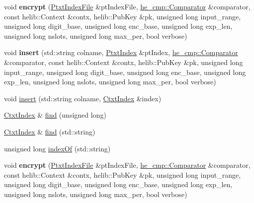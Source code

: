 \begin{DoxyCompactItemize}
\item 
\mbox{\label{classHDB__supergate___1_1CtxtIndexFile_a36979271995370a2e2376877cff9cf29}} 
void {\bfseries encrypt} (\hyperlink{classHDB__supergate___1_1PtxtIndexFile}{Ptxt\+Index\+File} \&pt\+Index\+File, \hyperlink{classhe__cmp_1_1Comparator}{he\+\_\+cmp\+::\+Comparator} \&comparator, const helib\+::\+Context \&contx, helib\+::\+Pub\+Key \&pk, unsigned long input\+\_\+range, unsigned long digit\+\_\+base, unsigned long enc\+\_\+base, unsigned long exp\+\_\+len, unsigned long nslots, unsigned long max\+\_\+per, bool verbose)
\item 
\mbox{\label{classHDB__supergate___1_1CtxtIndexFile_af5316d579090faa7872b4f00b5b55bdf}} 
void {\bfseries insert} (std\+::string colname, \hyperlink{classHDB__supergate___1_1PtxtIndex}{Ptxt\+Index} \&pt\+Index, \hyperlink{classhe__cmp_1_1Comparator}{he\+\_\+cmp\+::\+Comparator} \&comparator, const helib\+::\+Context \&contx, helib\+::\+Pub\+Key \&pk, unsigned long input\+\_\+range, unsigned long digit\+\_\+base, unsigned long enc\+\_\+base, unsigned long exp\+\_\+len, unsigned long nslots, unsigned long max\+\_\+per, bool verbose)
\item 
void \hyperlink{classHDB__supergate___1_1CtxtIndexFile_ab581d8e3c893b29a80b18413b1c45412}{insert} (std\+::string colname, \hyperlink{classHDB__supergate___1_1CtxtIndex}{Ctxt\+Index} \&index)
\item 
\hyperlink{classHDB__supergate___1_1CtxtIndex}{Ctxt\+Index} \& \hyperlink{classHDB__supergate___1_1CtxtIndexFile_a52792f06177d60f6580a664f24b706ee}{find} (unsigned long)
\item 
\hyperlink{classHDB__supergate___1_1CtxtIndex}{Ctxt\+Index} \& \hyperlink{classHDB__supergate___1_1CtxtIndexFile_aa579ec2799b316a65f426356ca76efd8}{find} (std\+::string)
\item 
unsigned long \hyperlink{classHDB__supergate___1_1CtxtIndexFile_abbc89b8e64ca3bcfe104c2371336bd9f}{index\+Of} (std\+::string)
\item 
\mbox{\label{classHDB__supergate___1_1CtxtIndexFile_a36979271995370a2e2376877cff9cf29}} 
void {\bfseries encrypt} (\hyperlink{classHDB__supergate___1_1PtxtIndexFile}{Ptxt\+Index\+File} \&pt\+Index\+File, \hyperlink{classhe__cmp_1_1Comparator}{he\+\_\+cmp\+::\+Comparator} \&comparator, const helib\+::\+Context \&contx, helib\+::\+Pub\+Key \&pk, unsigned long input\+\_\+range, unsigned long digit\+\_\+base, unsigned long enc\+\_\+base, unsigned long exp\+\_\+len, unsigned long nslots, unsigned long max\+\_\+per, bool verbose)

\end{DoxyCompactItemize}
